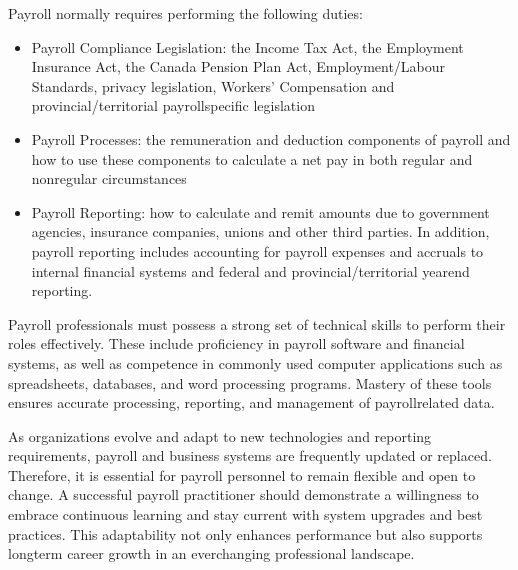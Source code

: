 \documentclass[letterpaper,10pt,english]{sphinxmanual}
\begin{document}
\sphinxAtStartPar
{}

\sphinxAtStartPar
Payroll normally requires performing the following duties:
\begin{itemize}
\item {} 
\sphinxAtStartPar
Payroll Compliance Legislation: the Income Tax Act, the Employment Insurance Act, the Canada Pension Plan Act, Employment/Labour Standards, privacy legislation, Workers’ Compensation and provincial/territorial payroll\sphinxhyphen{}specific legislation

\item {} 
\sphinxAtStartPar
Payroll Processes: the remuneration and deduction components of payroll and how to use these components to calculate a net pay in both regular and non\sphinxhyphen{}regular circumstances

\item {} 
\sphinxAtStartPar
Payroll Reporting: how to calculate and remit amounts due to government agencies, insurance companies, unions and other third parties. In addition, payroll reporting includes accounting for payroll expenses and accruals to internal financial systems and federal and provincial/territorial year\sphinxhyphen{}end reporting.

\end{itemize}

\sphinxAtStartPar
{}

\sphinxAtStartPar
Payroll professionals must possess a strong set of technical skills to perform their roles effectively. These include
proficiency in payroll software and financial systems, as well as competence in commonly used computer applications such as
spreadsheets, databases, and word processing programs. Mastery of these tools ensures accurate processing, reporting, and
management of payroll\sphinxhyphen{}related data.

\sphinxAtStartPar
As organizations evolve and adapt to new technologies and reporting requirements, payroll and business systems are frequently
updated or replaced. Therefore, it is essential for payroll personnel to remain flexible and open to change. A successful
payroll practitioner should demonstrate a willingness to embrace continuous learning and stay current with system upgrades and
best practices. This adaptability not only enhances performance but also supports long\sphinxhyphen{}term career growth in an ever\sphinxhyphen{}changing
professional landscape.

\sphinxAtStartPar
{}
\end{document}
